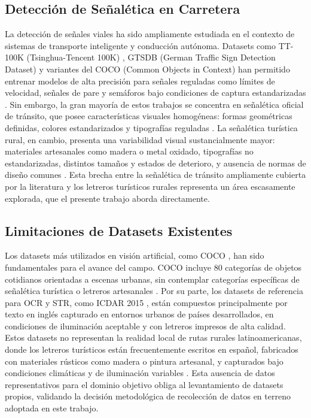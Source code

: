 \documentclass[runningheads]{llncs}
\begin{document}
\subsection{Detección de Señalética en Carretera}
La detección de señales viales ha sido ampliamente estudiada en el 
contexto de sistemas de transporte inteligente y conducción autónoma. 
Datasets como TT-100K (Tsinghua-Tencent 100K) \cite{TT100K-Dataset}, 
GTSDB (German Traffic Sign Detection Dataset) \cite{gtsdb-dataset} y 
variantes del COCO (Common Objects in Context) \cite{coco-microsoft} 
han permitido entrenar modelos de alta precisión para señales reguladas 
como límites de velocidad, señales de pare y semáforos bajo condiciones 
de captura estandarizadas \cite{letreros-transito-pare-semaforo-1}. 
Sin embargo, la gran mayoría de estos trabajos se concentra en señalética
oficial de tránsito, que posee características visuales homogéneas: 
formas geométricas definidas, colores estandarizados y tipografías 
reguladas \cite{articulo-trafico}. La señalética turística rural, en 
cambio, presenta una variabilidad visual sustancialmente mayor: materiales
 artesanales como madera o metal oxidado, tipografías no estandarizadas, 
 distintos tamaños y estados de deterioro, y ausencia de normas de diseño 
 comunes \cite{senales-rurales}. Esta brecha entre la señalética de 
 tránsito ampliamente cubierta por la literatura y los letreros turísticos
  rurales representa un área escasamente explorada, que el presente
   trabajo aborda directamente.

\subsection{Limitaciones de Datasets Existentes}
Los datasets más utilizados en visión artificial, como
COCO \cite{coco-microsoft}, han sido fundamentales para el avance del 
campo. COCO incluye 80 categorías \cite{80-clases-yolo} de objetos 
cotidianos orientadas a escenas urbanas, sin contemplar 
categorías específicas de señalética turística o letreros 
artesanales \cite{ultralytics_datasets_detect}. Por su parte, los 
datasets de referencia para OCR y STR, como ICDAR 2015 \cite{icdar}, 
están compuestos principalmente por texto en inglés 
capturado en entornos urbanos de países desarrollados, en condiciones 
de iluminación aceptable y con letreros impresos de alta 
calidad. Estos datasets no representan la realidad local de rutas rurales
latinoamericanas, donde los letreros turísticos están 
frecuentemente escritos en español, fabricados con materiales rústicos
 como madera o pintura artesanal, y capturados bajo 
condiciones climáticas y de iluminación variables \cite{senales-rurales}.
Esta ausencia de datos representativos para el dominio
objetivo obliga al levantamiento de datasets propios, validando la 
decisión metodológica de recolección de datos en terreno 
adoptada en este trabajo.
\end{document}
